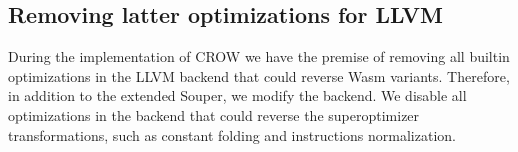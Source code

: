 \subsection{Removing latter optimizations for LLVM}

During the implementation of CROW we have the premise of removing all builtin optimizations in the LLVM backend that could reverse Wasm  variants.
Therefore, in addition to the extended Souper, we modify the \wasm backend.
We disable all optimizations in the \wasm backend that could reverse the superoptimizer transformations, such as constant folding and instructions normalization.




